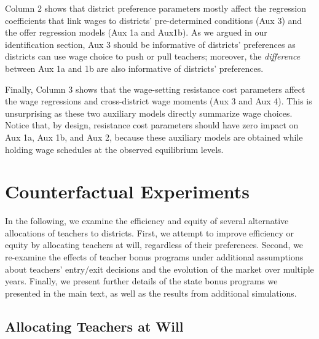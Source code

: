 \documentclass[notitlepage,12pt]{article}%
\begin{document}
Column 2 shows that district preference parameters mostly affect the
regression coefficients that link wages to districts' pre-determined
conditions (Aux 3) and the offer regression models (Aux 1a and Aux1b). As we
argued in our identification section, Aux 3 should be informative of
districts' preferences as districts can use wage choice to push or pull
teachers; moreover, the \textit{difference} between Aux 1a and 1b are also
informative of districts' preferences.

Finally, Column 3 shows that the wage-setting resistance cost parameters
affect the wage regressions and cross-district wage moments (Aux 3 and Aux 4).
This is unsurprising as these two auxiliary models directly summarize wage
choices. Notice that, by design, resistance cost parameters should have zero
impact on Aux 1a, Aux 1b, and Aux 2, because these auxiliary models are
obtained while holding wage schedules at the observed equilibrium levels.



\section{Counterfactual Experiments}

In the following, we examine the efficiency and equity of several alternative
allocations of teachers to districts. First, we attempt to improve efficiency
or equity by allocating teachers at will, regardless of their preferences.
Second, we re-examine the effects of teacher bonus programs under additional
assumptions about teachers' entry/exit decisions and the evolution of the
market over multiple years. Finally, we present further details of the state
bonus programs we presented in the main text, as well as the results from
additional simulations.

\subsection{Allocating Teachers at Will}
\end{document}
